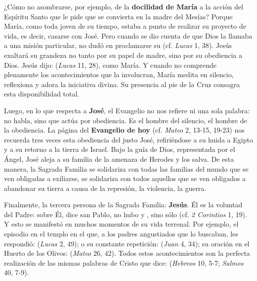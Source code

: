 \begin{body}
\begin{body}
¿Cómo no asombrarse, por ejemplo, de la \textbf{docilidad de María} a la acción del Espíritu Santo que le pide que se convierta en la madre del Mesías? Porque María, como toda joven de su tiempo, estaba a punto de realizar su proyecto de vida, es decir, casarse con José. Pero cuando se dio cuenta de que Dios la llamaba a una misión particular, no dudó en proclamarse su  (cf. \emph{Lucas} 1, 38). Jesús exaltará su grandeza no tanto por su papel de madre, sino por su obediencia a Dios. Jesús dijo:  (\emph{Lucas} 11, 28), como María. Y cuando no comprende plenamente los acontecimientos que la involucran, María medita en silencio, reflexiona y adora la iniciativa divina. Su presencia al pie de la Cruz consagra esta disponibilidad total.

Luego, en lo que respecta a \textbf{José}, el Evangelio no nos refiere ni una sola palabra: no habla, sino que actúa por obediencia. Es el hombre del silencio, el hombre de la obediencia. La página del \textbf{Evangelio de hoy} (cf. \emph{Mateo} 2, 13-15, 19-23) nos recuerda tres veces esta obediencia del justo José, refiriéndose a su huida a Egipto y a su retorno a la tierra de Israel. Bajo la guía de Dios, representada por el Ángel, José aleja a su familia de la amenaza de Herodes y los salva. De esta manera, la Sagrada Familia se solidariza con todas las familias del mundo que se ven obligadas a exiliarse, se solidariza con todos aquellos que se ven obligados a abandonar su tierra a causa de la represión, la violencia, la guerra.

Finalmente, la tercera persona de la Sagrada Familia: \textbf{Jesús}. Él es la voluntad del Padre: sobre Él, dice san Pablo, no hubo  y , sino sólo  (cf. \emph{2 Corintios} 1, 19). Y esto se manifestó en muchos momentos de su vida terrenal. Por ejemplo, el episodio en el templo en el que, a los padres angustiados que lo buscaban, les respondió:  (\emph{Lucas} 2, 49); o su constante repetición:  (\emph{Juan} 4, 34); su oración en el Huerto de los Olivos:  (\emph{Mateo} 26, 42). Todos estos acontecimientos son la perfecta realización de las mismas palabras de Cristo que dice:  (\emph{Hebreos} 10, 5-7; \emph{Salmos} 40, 7-9).


\end{body}
\end{body}
